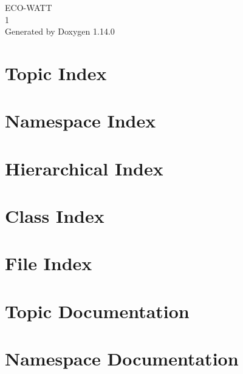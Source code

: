 \documentclass[twoside]{book}
\newcommand{\+}{\discretionary{\mbox{\scriptsize$\hookleftarrow$}}{}{}}
\newcommand{\clearemptydoublepage}{%
    \newpage{\pagestyle{empty}\cleardoublepage}%
  }
\begin{document}
  \raggedbottom
    \hypersetup{pageanchor=false,
                bookmarksnumbered=true,
                pdfencoding=unicode
               }
  \begin{titlepage}
  \vspace*{7cm}
  \begin{center}%
  {\Large ECO-\/\+WATT}\\
  [1ex]\large 1 \\
  \vspace*{1cm}
  {\large Generated by Doxygen 1.14.0}\\
  \end{center}
  \end{titlepage}
  \clearemptydoublepage
  \tableofcontents
  \clearemptydoublepage
  \hypersetup{pageanchor=true}
\chapter{Topic Index}

\chapter{Namespace Index}

\chapter{Hierarchical Index}

\chapter{Class Index}

\chapter{File Index}

\chapter{Topic Documentation}







\chapter{Namespace Documentation}


\end{document}
